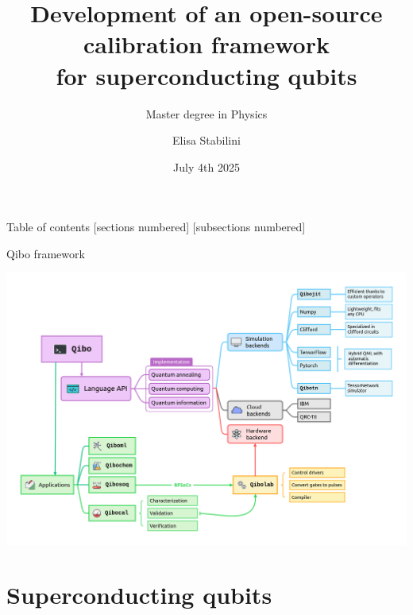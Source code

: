 \documentclass[aspectratio=169,10pt]{beamer}
\title{Development of an open-source calibration framework\\ for superconducting qubits}
\subtitle{Master degree in Physics}
\author{Elisa Stabilini}
\institute{Università degli Studi di Milano - Department of Physics}
\date{July 4th 2025}
\begin{document}
\maketitle

\begin{frame}{Table of contents}
    [sections numbered]
    [subsections numbered]  
    \tableofcontents[hideallsubsections]
\end{frame}

\begin{frame}[t,fragile]{Qibo framework}
  \begin{center}
      \includegraphics[height=0.80\paperheight]{figures/qibo_ecosystem.png}
  \end{center}
\end{frame}

\section{Superconducting qubits}
\end{document}
